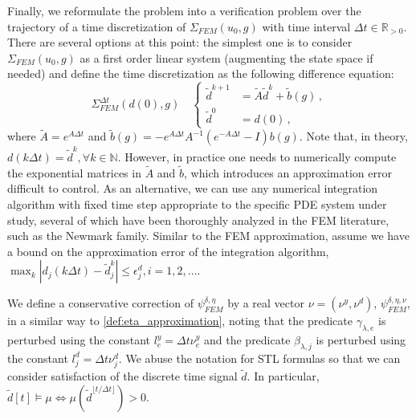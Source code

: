 \documentclass[letterpaper, 10 pt, conference]{ieeeconf/ieeeconf}
\newcommand*{\R}{\mathbb{R}}
\newcommand*{\N}{\mathbb{N}}
\newcommand{\Always}{\mathbf{G}}
\begin{document}
Finally, we reformulate the problem into a verification problem over the
trajectory of a time discretization of $\Sigma_{FEM}(u_0, g)$ with time interval $\Delta
t \in \R_{>0}$. There are several options at this point: the simplest one is to
consider $\Sigma_{FEM}(u_0, g)$ as a first order linear system (augmenting the state
space if needed) and define the time discretization as the following difference
equation:
%
\begin{equation}
    \label{eq:disc_system}
    \Sigma_{FEM}^{\Delta t}(d(0), g) \quad \left\{
    \begin{aligned}
        \tilde d^{k+1} &= \tilde A \tilde d^k + \tilde b(g) \,, \\
        \tilde d^0 &= d(0) \,,
    \end{aligned}
    \right.
\end{equation}
%
where $\tilde A = e^{A \Delta t}$ and $\tilde b(g) = - e^{A \Delta t} A^{-1} 
( e^{- A \Delta t} - I ) b(g)$. Note that, in theory, $d(k \Delta t) = \tilde d^k,
\forall k \in \N$. However, in practice one needs to numerically compute the
exponential matrices in $\tilde A$ and $\tilde b$, which introduces an
approximation error difficult to control. As an alternative, we can use any
numerical integration algorithm with fixed time step appropriate to the specific
PDE system under study, several of which have been
thoroughly analyzed in the FEM literature, such as the Newmark family. Similar
to the FEM approximation, assume we have a bound on the approximation error of
the integration algorithm, $\max_k |d_j(k \Delta t) - \tilde d^k_j| \leq
\epsilon^d_j, i=1,2,...$.

We define a conservative correction of $\psi^{\delta, \eta}_{FEM}$ by a real
vector $\nu = (\nu^y, \nu^d)$, $\psi^{\delta, \eta, \nu}_{FEM}$, in a similar
way to \cref{def:eta_approximation}, noting that the predicate $\gamma_{\lambda, e}$ is perturbed
using the constant $l_e^y = \Delta t \nu^y_e$ and the predicate $\beta_{\lambda, j}$ is
perturbed using the constant $l_j^d = \Delta t \nu^d_j$. We abuse the notation
for STL formulas so that we can consider satisfaction of the discrete time
signal $\tilde{d}$. In particular, $\tilde{d}[t] \models \mu \iff
\mu(\tilde{d}^{\lfloor t / \Delta t \rfloor}) > 0$.
\end{document}
